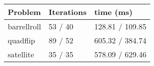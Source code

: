 \begin{tabular}{lll}
\toprule 
Problem & Iterations & time (ms) \\
\midrule 
barrellroll & 53 / 40 & 128.81 / 109.85 \\
quadflip & 89 / 52 & 605.32 / 384.74 \\
satellite & 35 / 35 & 578.09 / 629.46 \\
\bottomrule 
\end{tabular}

